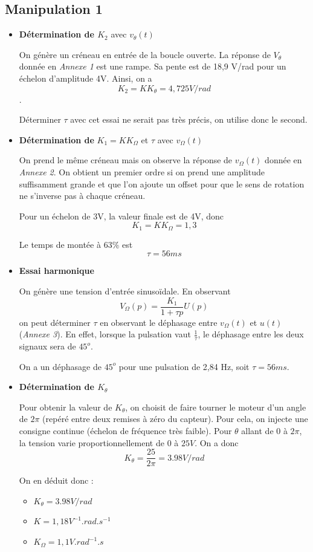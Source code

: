 \documentclass[../../Cours_M1.tex]{subfiles}
\begin{document}
\subsection*{Manipulation 1}
\begin{itemize}\setlength{\itemsep}{10mm}
\item \textbf{Détermination de $K_2$} avec $v_{\theta}(t)$

On génère un créneau en entrée de la boucle ouverte. La réponse de $V_{\theta}$ donnée en \emph{Annexe 1} est une rampe. Sa pente est de 18,9 V/rad pour un échelon d'amplitude 4V. Ainsi, on a \[\boxed{K_2 = KK_{\theta} = 4,725 V/rad} \].

Déterminer $\tau$ avec cet essai ne serait pas très précis, on utilise donc le second.

\item \textbf{Détermination de} $K_1=KK_{\Omega}$ et $\tau$ avec $v_{\Omega}(t)$

On prend le même créneau mais on observe la réponse de $v_{\Omega}(t)$ donnée en \emph{Annexe 2}. On obtient un premier ordre si on prend une amplitude suffisamment grande et que l'on ajoute un offset pour que le sens de rotation ne s'inverse pas à chaque créneau.

Pour un échelon de 3V, la valeur finale est de 4V, donc \[\boxed{K_1 = KK_{\Omega} = 1,3}\]

Le temps de montée à $63\%$ est \[\boxed{\tau = 56ms}\]

\item \textbf{Essai harmonique}

On génère une tension d'entrée sinusoïdale. En observant 
\[V_{\Omega}(p) = \frac{K_1}{1+\tau p} U(p)\]
on peut déterminer $\tau$ en observant le déphasage entre $v_{\Omega}(t)$ et $u(t)$ (\emph{Annexe 3}). En effet, lorsque la pulsation vaut $\frac{1}{\tau}$, le déphasage entre les deux signaux sera de $45^o$.

On a un déphasage de $45^o$ pour une pulsation de 2,84 Hz, soit $\tau = 56ms$.

\item \textbf{Détermination de $K_{\theta}$}

Pour obtenir la valeur de $K_{\theta}$, on choisit de faire tourner le moteur d'un angle de $2\pi$ (repéré entre deux remises à zéro du capteur). Pour cela, on injecte une consigne continue (échelon de fréquence très faible). Pour $\theta$ allant de 0 à $2\pi$, la tension varie proportionnellement de $0$ à $25V$. 
On a donc
\[K_{\theta} = \frac{25}{2\pi} = 3.98 V/rad\]

On en déduit donc :
\begin{itemize}
\item $K_{\theta} = 3.98 V/rad$
\item $K = 1,18 V^{-1}.rad.s^{-1}$
\item $K_{\Omega} = 1,1V.rad^{-1}.s$
\end{itemize} 


\end{itemize}
\end{document}
